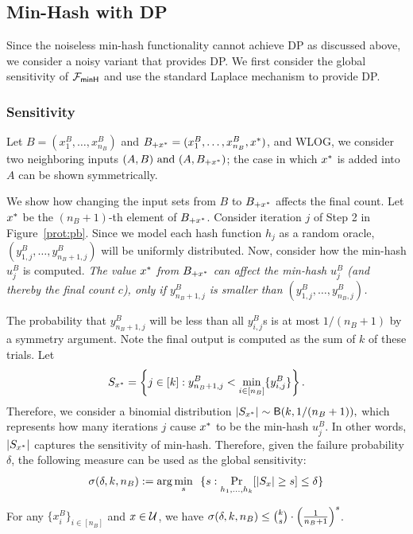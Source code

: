 \subsection{Min-Hash with DP}
\label{sec:basic}
Since the noiseless min-hash functionality cannot achieve DP as discussed above, we consider a noisy variant that provides DP. We first consider the global sensitivity of ${\mathcal{F}_\mathsf{minH}}$ and use the standard Laplace mechanism to provide DP. 

\subsubsection{Sensitivity} \label{sec:sensitivity}
Let $B = (x_1^B, \ldots, x_{n_B}^B)$ and $B_{+x^*} = (x_1^B, \ldots,
x_{n_B}^B, {x^*})$, and WLOG, we consider two neighboring inputs $(A, B)
\mbox{ and } (A, B_{+x^*})$; the case in which ${x^*}$ is added into $A$ can be
shown symmetrically. 

We show how changing the input sets from $B$ to
$B_{+x^*}$ affects the final count. Let ${x^*}$ be the $(n_B+1)$-th element of
$B_{+x^*}$.  Consider iteration $j$ of Step 2 in Figure~\ref{prot:pb}. Since
we model each hash function $h_j$ as a random oracle, $(y^B_{1, j},
\ldots, y^B_{n_B+1, j})$ will be uniformly distributed.
%
Now, consider how the min-hash $u_j^B$ is computed. {\it The value 
${x^*}$ from $B_{+x^*}$ can affect the min-hash $u_j^B$ (and thereby the final
count $c$), only if $y^B_{n_B+1,j}$ is smaller than $(y^B_{1, j}, \ldots,
y^B_{n_B, j})$.} 

The probability that $y^B_{n_B+1,j}$ will be less than all $y^B_{i,j}$s is at most $1/(n_B+1)$
by a symmetry argument. Note the final output is computed as the
sum of $k$ of these trials.
%
Let $$S_{x^*} = \left\{j \in [k]: y^B_{n_B+1,j} < \min_{i \in [n_B]} \{y^B_{i,j}\}
\right\}.$$ 
Therefore, we consider a binomial distribution $|S_{x^*}| \sim \mathsf{B}(k,1/(n_B+1)),$
which represents how many iterations $j$ cause ${x^*}$ to be the min-hash
$u_j^B$. In other words, $|S_{x^*}|$ captures the sensitivity of min-hash. 
%
Therefore, given the failure probability $\delta$, the following measure
can be used as the global sensitivity: 
$$\mathsf{\sigma}(\delta, k, n_B) := \arg\min_s ~~\{s: \Pr_{h_1, \ldots, h_k}[|S_x| \ge s] \le \delta \} $$

\begin{lemma}\label{lem:sen}
   For any $\{x_{i}^B\}_{i \in [n_B]}$ and $x \in \mathcal{U}$, we have
   $\mathsf{\sigma}(\delta, k, n_B) \le  \binom{k}{s} \cdot \left(\frac{1}{n_B+1}\right)^s$.  \end{lemma}

